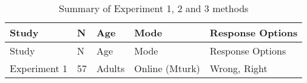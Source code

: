 \documentclass[,man,floatsintext]{apa6}
\begin{document}
\begin{longtable}[]{@{}lllll@{}}
\caption{\label{tab:study1info}Summary of Experiment 1, 2 and 3 methods}\tabularnewline
\toprule
\begin{minipage}[b]{0.16\columnwidth}\raggedright
Study\strut
\end{minipage} & \begin{minipage}[b]{0.01\columnwidth}\raggedright
N\strut
\end{minipage} & \begin{minipage}[b]{0.17\columnwidth}\raggedright
Age\strut
\end{minipage} & \begin{minipage}[b]{0.17\columnwidth}\raggedright
Mode\strut
\end{minipage} & \begin{minipage}[b]{0.34\columnwidth}\raggedright
Response Options\strut
\end{minipage}\tabularnewline
\midrule
\endfirsthead
\toprule
\begin{minipage}[b]{0.16\columnwidth}\raggedright
Study\strut
\end{minipage} & \begin{minipage}[b]{0.01\columnwidth}\raggedright
N\strut
\end{minipage} & \begin{minipage}[b]{0.17\columnwidth}\raggedright
Age\strut
\end{minipage} & \begin{minipage}[b]{0.17\columnwidth}\raggedright
Mode\strut
\end{minipage} & \begin{minipage}[b]{0.34\columnwidth}\raggedright
Response Options\strut
\end{minipage}\tabularnewline
\midrule
\endhead
\begin{minipage}[t]{0.16\columnwidth}\raggedright
Experiment 1\strut
\end{minipage} & \begin{minipage}[t]{0.01\columnwidth}\raggedright
57\strut
\end{minipage} & \begin{minipage}[t]{0.17\columnwidth}\raggedright
Adults\strut
\end{minipage} & \begin{minipage}[t]{0.17\columnwidth}\raggedright
Online (Mturk)\strut
\end{minipage} & \begin{minipage}[t]{0.34\columnwidth}\raggedright
Wrong, Right\strut

\end{minipage}
\end{longtable}
\end{document}
